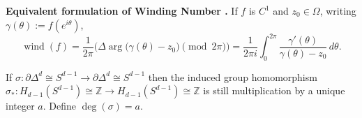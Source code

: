 \noindent\textbf{Equivalent formulation of Winding Number \cite{stein03}.}
If $f$ is $C^1$ and $z_0\in\Omega$, writing $\gamma(\theta):=f(e^{i\theta})$,
\[
\operatorname{wind}(f)=\frac{1}{2\pi} \big(\Delta\arg\!\big(\gamma(\theta)-z_0\big) \pmod{2\pi}\big)
=\frac{1}{2\pi i}\int_0^{2\pi}\frac{\gamma'(\theta)}{\gamma(\theta)-z_0}\,d\theta.
\]

\begin{definition}\label{def:deg-higher-dims}
If $\sigma: \partial\Delta^d \cong S^{d-1}\to \partial\Delta^d\cong S^{d-1}$ then the induced group homomorphism $\sigma_*:H_{d-1}(S^{d-1})\cong \mathbb{Z} \to H_{d-1}(S^{d-1})\cong \mathbb{Z}$ is still multiplication by a unique integer $a$. Define $\operatorname{deg}(\sigma)=a$.
\end{definition}


